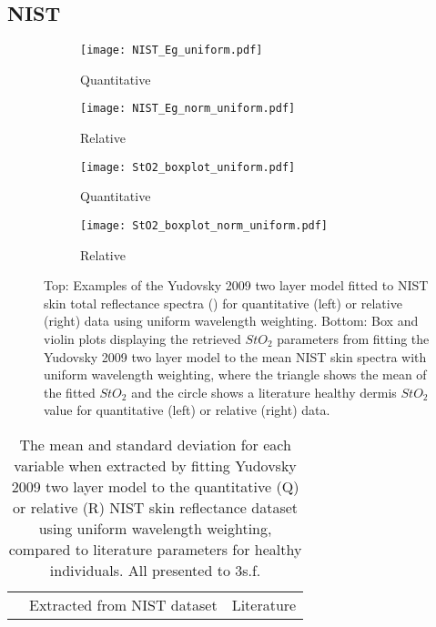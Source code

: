 \begin{subappendices}
\subsection{NIST}
\begin{figure}[h] 
    \centering
    \begin{subfigure}{0.49\textwidth}
        \texttt{[image: NIST\_Eg\_uniform.pdf]}
        \caption{Quantitative}
        \label{fig:egspectraNISTu}
    \end{subfigure}
    \begin{subfigure}{0.49\textwidth}
        \texttt{[image: NIST\_Eg\_norm\_uniform.pdf]}
        \caption{Relative}
        \label{fig:egspectraNISTnormu}
    \end{subfigure}
    \begin{subfigure}{0.49\textwidth}
        \texttt{[image: StO2\_boxplot\_uniform.pdf]}
        \caption{Quantitative}
        \label{fig:egparamStO2NISTu}
    \end{subfigure}
    \begin{subfigure}{0.49\textwidth}
        \texttt{[image: StO2\_boxplot\_norm\_uniform.pdf]}
        \caption{Relative}
        \label{fig:egparamStO2NISTnormu}
    \end{subfigure}
    \caption{Top: Examples of the Yudovsky 2009 two layer model fitted to NIST skin total reflectance spectra () for quantitative (left) or relative (right) data using uniform wavelength weighting. Bottom: Box and violin plots displaying the retrieved $StO_2$ parameters from fitting the Yudovsky 2009 two layer model to the mean NIST skin spectra with uniform wavelength weighting, where the triangle shows the mean of the fitted $StO_2$ and the circle shows a literature healthy dermis $StO_2$ value \citep{VanManen2021} for quantitative (left) or relative (right) data.}
    \label{fig:NISTuniform}
\end{figure}
\begin{table}[h]
    \centering
    \caption{The mean and standard deviation for each variable when extracted by fitting Yudovsky 2009 two layer model to the quantitative (Q) or relative (R) NIST skin reflectance dataset using uniform wavelength weighting, compared to literature parameters for healthy individuals. All presented to 3s.f.}
    \begin{tabular}{|c|ccc|ccc|}
        \hline
         & \multicolumn{3}{c}{Extracted from NIST dataset} & \multicolumn{3}{|c|}{Literature} \\

\end{tabular}
\end{table}
\end{subappendices}
